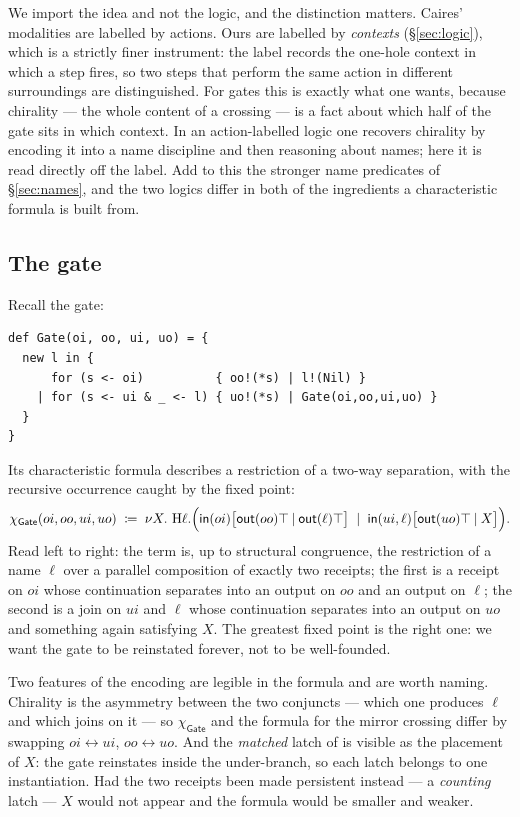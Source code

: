 \documentclass[11pt]{article}
\theoremstyle{definition}
\newcommand{\Gate}{\mathsf{Gate}}
\newcommand{\charf}[1]{\chi_{#1}}
\newcommand{\sep}{\mathbin{\vert}}
\newcommand{\Hq}{\mathrm{H}}
\begin{document}
We import the idea and not the logic, and the distinction matters. Caires'
modalities are labelled by actions. Ours are labelled by \emph{contexts}
(\S\ref{sec:logic}), which is a strictly finer instrument: the label records the
one-hole context in which a step fires, so two steps that perform the same action
in different surroundings are distinguished. For gates this is exactly what one
wants, because chirality --- the whole content of a crossing --- is a fact about
which half of the gate sits in which context. In an action-labelled logic one
recovers chirality by encoding it into a name discipline and then reasoning about
names; here it is read directly off the label. Add to this the stronger name
predicates of \S\ref{sec:names}, and the two logics differ in both of the
ingredients a characteristic formula is built from.

\subsection{The gate}

Recall the gate:
\begin{lstlisting}
def Gate(oi, oo, ui, uo) = {
  new l in {
      for (s <- oi)          { oo!(*s) | l!(Nil) }
    | for (s <- ui & _ <- l) { uo!(*s) | Gate(oi,oo,ui,uo) }
  }
}
\end{lstlisting}
Its characteristic formula describes a restriction of a two-way separation, with
the recursive occurrence caught by the fixed point:
\[
\charf{\Gate}(oi,oo,ui,uo)
\;\coloneqq\;
\nu X.\ \Hq \ell.\Bigl(
  \mathsf{in}(oi)\bigl[\mathsf{out}(oo)\top \sep \mathsf{out}(\ell)\top\bigr]
  \ \sep\
  \mathsf{in}(ui,\ell)\bigl[\mathsf{out}(uo)\top \sep X\bigr]
\Bigr).
\]
Read left to right: the term is, up to structural congruence, the restriction of a
name $\ell$ over a parallel composition of exactly two receipts; the first is a
receipt on $oi$ whose continuation separates into an output on $oo$ and an output
on $\ell$; the second is a join on $ui$ and $\ell$ whose continuation separates
into an output on $uo$ and something again satisfying $X$. The greatest fixed
point is the right one: we want the gate to be reinstated forever, not to be
well-founded.

Two features of the encoding are legible in the formula and are worth naming.
Chirality is the asymmetry between the two conjuncts --- which one produces
$\ell$ and which joins on it --- so $\charf{\Gate}$ and the formula for the mirror
crossing differ by swapping $oi \leftrightarrow ui$, $oo \leftrightarrow uo$. And
the \emph{matched} latch of \cite{knots} is visible as the placement of $X$: the
gate reinstates inside the under-branch, so each latch belongs to one
instantiation. Had the two receipts been made persistent instead --- a
\emph{counting} latch --- $X$ would not appear and the formula would be smaller
and weaker.
\end{document}
